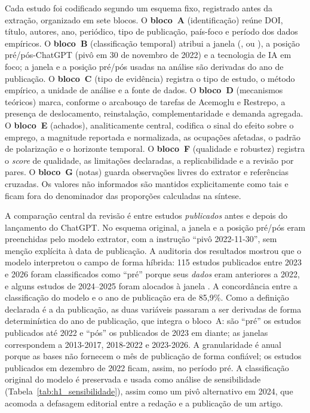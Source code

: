 Cada estudo foi codificado segundo um esquema fixo, registrado antes da extração, organizado em sete blocos. O \textbf{bloco~A} (identificação) reúne DOI, título, autores, ano, periódico, tipo de publicação, país-foco e período dos dados empíricos. O \textbf{bloco~B} (classificação temporal) atribui a janela (\janelaUm{}, \janelaDois{} ou \janelaTres{}), a posição pré/pós-ChatGPT (pivô em 30 de novembro de 2022) e a tecnologia de IA em foco; a janela e a posição pré/pós usadas na análise são derivadas do ano de publicação. O \textbf{bloco~C} (tipo de evidência) registra o tipo de estudo, o método empírico, a unidade de análise e a fonte de dados. O \textbf{bloco~D} (mecanismos teóricos) marca, conforme o arcabouço de tarefas de Acemoglu e Restrepo, a presença de deslocamento, reinstalação, complementaridade e demanda agregada. O \textbf{bloco~E} (achados), analiticamente central, codifica o sinal do efeito sobre o emprego, a magnitude reportada e normalizada, as ocupações afetadas, o padrão de polarização e o horizonte temporal. O \textbf{bloco~F} (qualidade e robustez) registra o \textit{score} de qualidade, as limitações declaradas, a replicabilidade e a revisão por pares. O \textbf{bloco~G} (notas) guarda observações livres do extrator e referências cruzadas. Os valores não informados são mantidos explicitamente como tais e ficam fora do denominador das proporções calculadas na síntese.


A comparação central da revisão é entre estudos \emph{publicados} antes e depois do lançamento do ChatGPT. No esquema original, a janela e a posição pré/pós eram preenchidas pelo modelo extrator, com a instrução ``pivô 2022-11-30'', sem menção explícita à data de publicação. A auditoria dos resultados mostrou que o modelo interpretou o campo de forma híbrida: 115 estudos publicados entre 2023 e 2026 foram classificados como ``pré'' porque seus \emph{dados} eram anteriores a 2022, e alguns estudos de 2024--2025 foram alocados à janela \janelaUm{}. A concordância entre a classificação do modelo e o ano de publicação era de 85,9\%. Como a definição declarada é a da publicação, as duas variáveis passaram a ser derivadas de forma determinística do ano de publicação, que integra o bloco~A: são ``pré'' os estudos publicados até 2022 e ``pós'' os publicados de 2023 em diante; as janelas correspondem a 2013-2017, 2018-2022 e 2023-2026. A granularidade é anual porque as bases não fornecem o mês de publicação de forma confiável; os estudos publicados em dezembro de 2022 ficam, assim, no período pré. A classificação original do modelo é preservada e usada como análise de sensibilidade (Tabela~\ref{tab:h1_sensibilidade}), assim como um pivô alternativo em 2024, que acomoda a defasagem editorial entre a redação e a publicação de um artigo.

